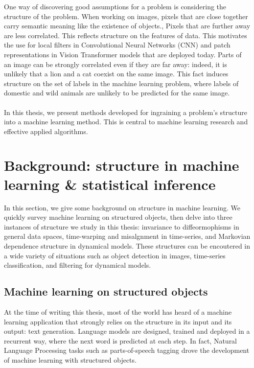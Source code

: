 One way of discovering good assumptions for a problem is considering the structure of the problem. When working on images, pixels that are close together carry semantic meaning like the existence of objects., Pixels that are further away are less correlated. This reflects structure on the features of data. This motivates the use for local filters in Convolutional Neural Networks (CNN) and patch representations in Vision Transformer models that are deployed today. Parts of an image can be strongly correlated even if they are far away: indeed, it is unlikely that a lion and a cat coexist on the same image. This fact induces structure on the set of labels in the machine learning problem, where labels of domestic and wild animals are unlikely to be predicted for the same image.

\paragraph{}
In this thesis, we present methods developed for ingraining a problem's structure into a machine learning method. This is central to machine learning research and effective applied algorithms.

\section{Background: structure in machine learning \& statistical inference}

In this section, we give some background on structure in machine learning. We quickly survey machine learning on structured objects, then delve into three instances of structure we study in this thesis: invariance to diffeormophisms in general data spaces, time-warping and misalgnment in time-series, and Markovian dependence structure in dynamical models. These structures can be encoutered in a wide variety of situations such as object detection in images, time-series classification, and filtering for dynamical models.

\subsection{Machine learning on structured objects}

At the time of writing this thesis, most of the world has heard of a machine learning application that strongly relies on the structure in its input and its output: text generation. Language models are designed, trained and deployed in a recurrent way, where the next word is predicted at each step. In fact, Natural Language Processing tasks such as parts-of-speech tagging drove the development of machine learning with structured objects.

